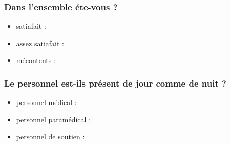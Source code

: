 \documentclass{tiba}
\begin{document}
\subsubsection*{Dans l'ensemble éte-vous ?}
\begin{itemize}
  \item satiafait : \re
  \item assez satiafait : \re
  \item mécontents : \re
\end{itemize}

\subsubsection*{Le personnel est-ils présent de jour comme de nuit ?}
\begin{itemize}
  \item personnel médical : \re
  \item personnel paramédical : \re
  \item personnel de soutien : \re
\end{itemize}


 






































% 	
% 	
% 	
% 	
% 	
% 	





%


\cite{ref3}



\end{document}
